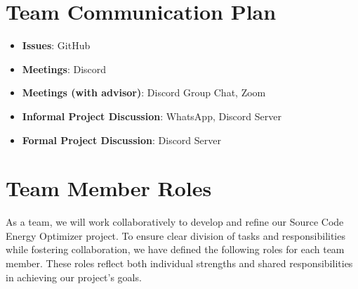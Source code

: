 \documentclass{article}
\begin{document}
\section{Team Communication Plan}

\begin{itemize}

    \item \textbf{Issues}: GitHub 
    \item \textbf{Meetings}: Discord
    \item \textbf{Meetings (with advisor)}: Discord Group Chat, Zoom
    \item \textbf{Informal Project Discussion}: WhatsApp, Discord Server
    \item \textbf{Formal Project Discussion}: Discord Server
    
\end{itemize}

\section{Team Member Roles}

As a team, we will work collaboratively to develop and refine our Source Code Energy Optimizer project. To ensure clear division 
of tasks and responsibilities while fostering collaboration, we have defined the following roles for each team member. These roles 
reflect both individual strengths and shared responsibilities in achieving our project’s goals.
\end{document}
